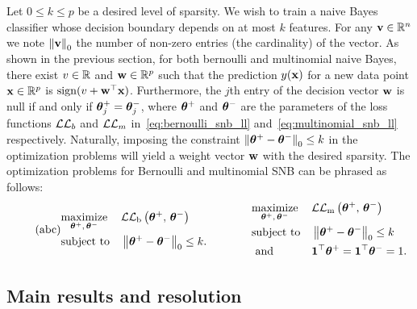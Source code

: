 Let $0 \leq k \leq p$ be a desired level of sparsity.
We wish to train a naive Bayes classifier whose decision boundary depends on at most $k$ features.
For any $\mathbf{v} \in \mathbb{R}^n$ we note $\left\lVert\mathbf{v}\right\rVert_0$ the number of non-zero entries
(the cardinality) of the vector.
As shown in the previous section, for both bernoulli and multinomial naive Bayes,
there exist $v \in \mathbb{R}$ and $\mathbf{w} \in \mathbb{R}^p$ such that the prediction $y(\mathbf{x})$ for a new data point $\mathbf{x}\in\mathbb{R}^p$ is
$\operatorname*{sign}(v + \mathbf{w}^\top\mathbf{x})$.
Furthermore, the $j$th entry of the decision vector $\mathbf{w}$ is null if and only if $\bm{\theta}^+_j = \bm{\theta}^-_j$,
where $\bm{\theta}^+$ and $\bm{\theta}^-$ are the parameters of the loss functions $\mathcal{L}\mathcal{L}_b$ and $\mathcal{L}\mathcal{L}_m$
in~\ref{eq:bernoulli_snb_ll} and~\ref{eq:multinomial_snb_ll} respectively.
Naturally, imposing the constraint $\left\lVert\bm{\theta}^+ - \bm{\theta}^-\right\rVert_0 \leq k$ in the optimization problems
will yield a weight vector $\mathbf{w}$ with the desired sparsity.
The optimization problems for Bernoulli and multinomial SNB can be phrased as follows:
\begin{equation}\label{eq:bsnb}\tag{abc}
        \begin{aligned}
                & \underset{\bm{\theta}^+,\, \bm{\theta}^-}{\text{maximize}}
                & & \mathcal{L}\mathcal{L}_\text{b}\left( \bm{\theta}^+,\, \bm{\theta}^- \right)\\
                & \text{subject to}
                & & \left\lVert\bm{\theta}^+ - \bm{\theta}^-\right\rVert_0 \leq k.
        \end{aligned}
        \qquad\qquad
        \begin{aligned}
                & \underset{\bm{\theta}^+,\, \bm{\theta}^-}{\text{maximize}}
                & & \mathcal{L}\mathcal{L}_\text{m}\left( \bm{\theta}^+,\, \bm{\theta}^- \right)\\
                & \text{subject to}
                & & \left\lVert\bm{\theta}^+ - \bm{\theta}^-\right\rVert_0 \leq k\\
                & \text{ and }
                & & \mathbf{1}^\top\bm{\theta}^+ = \mathbf{1}^\top\bm{\theta}^- = 1.
        \end{aligned}
\end{equation}

\subsection{Main results and resolution}\label{subsec:snb_th}


